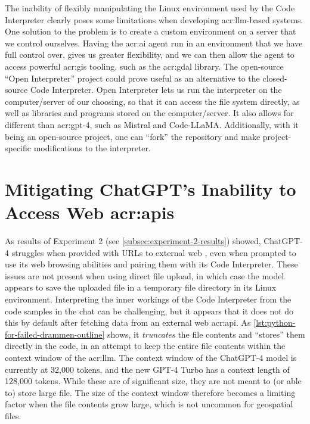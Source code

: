The inability of flexibly manipulating the Linux environment used by the Code Interpreter clearly poses some limitations when developing \acrshort{acr:llm}-based systems. One solution to the problem is to create a custom environment on a server that we control ourselves. Having the \acrshort{acr:ai} agent run in an environment that we have full control over, gives us greater flexibility, and we can then allow the agent to access powerful \acrshort{acr:gis} tooling, such as the \acrshort{acr:gdal} library. The open-source \enquote{Open Interpreter} project \citep{killianlucasKillianLucasOpeninterpreter2023} could prove useful as an alternative to the closed-source Code Interpreter. Open Interpreter lets us run the interpreter on the computer/server of our choosing, so that it can access the file system directly, as well as libraries and programs stored on the computer/server. It also allows for different  than \acrshort{acr:gpt}-4, such as Mistral  and Code-LLaMA. Additionally, with it being an open-source project, one can \enquote{fork} the repository and make project-specific modifications to the interpreter.

\section[Mitigating ChatGPT's Inability to Access Web APIs]{Mitigating ChatGPT's Inability to Access Web \acrshort{acr:api}s}\label{sec:api-access-discussion}

As results of Experiment 2 (see \autoref{subsec:experiment-2-results}) showed, ChatGPT-4 struggles when provided with URLs to external web , even when prompted to use its web browsing abilities and pairing them with its Code Interpreter. These issues are not present when using direct file upload, in which case the model appears to save the uploaded file in a temporary file directory in its Linux environment. Interpreting the inner workings of the Code Interpreter from the code samples in the chat can be challenging, but it appears that it does not do this by default after fetching data from an external web \acrshort{acr:api}. As \autoref{lst:python-for-failed-drammen-outline} shows, it \textit{truncates} the file contents and \enquote{stores} them directly in the code, in an attempt to keep the entire file contents within the context window of the \acrshort{acr:llm}. The context window of the ChatGPT-4 model is currently at 32,000 tokens, and the new GPT-4 Turbo has a context length of 128,000 tokens. While these are of significant size, they are not meant to (or able to) store large file. The size of the context window therefore becomes a limiting factor when the file contents grow large, which is not uncommon for geospatial files.


